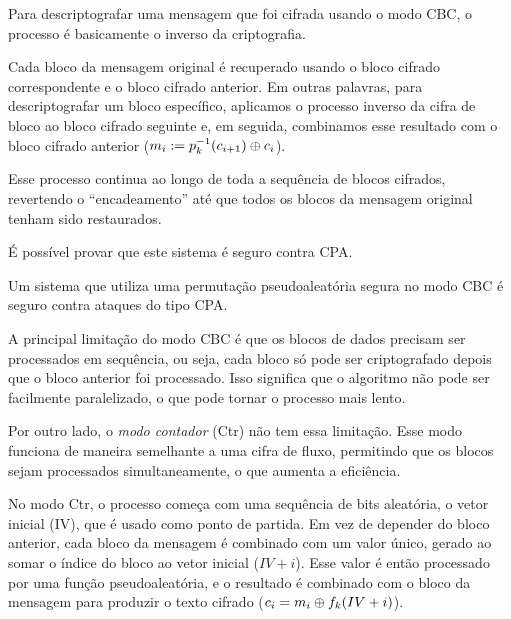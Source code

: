 Para descriptografar uma mensagem que foi cifrada usando o modo CBC, o processo é basicamente o inverso da criptografia.

Cada bloco da mensagem original é recuperado usando o bloco cifrado correspondente e o bloco cifrado anterior.
Em outras palavras, para descriptografar um bloco específico, aplicamos o processo inverso da cifra de bloco ao bloco cifrado seguinte e, em seguida, combinamos esse resultado com o bloco cifrado anterior ($m_{i}  :=  p_k^{-1}(c_{i+1}) \oplus c_{i}$).

Esse processo continua ao longo de toda a sequência de blocos cifrados, revertendo o ``encadeamento'' até que todos os blocos da mensagem original tenham sido restaurados.

É possível provar que este sistema é seguro contra CPA.

\begin{theorem}
Um sistema que utiliza uma permutação pseudoaleatória segura no modo CBC é seguro contra ataques do tipo CPA.
\end{theorem}


A principal limitação do modo CBC é que os blocos de dados precisam ser processados em sequência, ou seja, cada bloco só pode ser criptografado depois que o bloco anterior foi processado.
Isso significa que o algoritmo não pode ser facilmente paralelizado, o que pode tornar o processo mais lento.

Por outro lado, o {\em modo contador} (Ctr) não tem essa limitação.
Esse modo funciona de maneira semelhante a uma cifra de fluxo, permitindo que os blocos sejam processados simultaneamente, o que aumenta a eficiência.

No modo Ctr, o processo começa com uma sequência de bits aleatória, o vetor inicial (IV), que é usado como ponto de partida.
Em vez de depender do bloco anterior, cada bloco da mensagem é combinado com um valor único, gerado ao somar o índice do bloco ao vetor inicial ($IV + i$).
Esse valor é então processado por uma função pseudoaleatória, e o resultado é combinado com o bloco da mensagem para produzir o texto cifrado ($c_i = m_i \oplus f_k(IV + i)$).

\begin{center}
\end{center}


